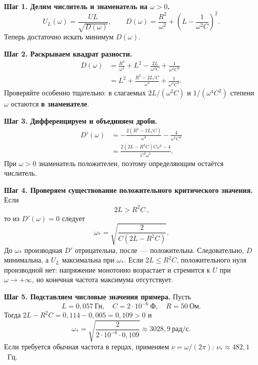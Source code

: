\documentclass[a4paper,12pt]{article}
\begin{document}
\textbf{Шаг 1. Делим числитель и знаменатель на $\omega>0$.}
\[
U_L(\omega)=\frac{UL}{\sqrt{D(\omega)}},\qquad
D(\omega)=\frac{R^2}{\omega^2}+
\left(L-\frac{1}{\omega^2 C}\right)^2.
\]
Теперь достаточно искать минимум $D(\omega)$.

\textbf{Шаг 2. Раскрываем квадрат разности.}
\[
\begin{aligned}
D(\omega)&=\frac{R^2}{\omega^2}
+L^2-\frac{2L}{\omega^2 C}+\frac{1}{\omega^4 C^2}\\
&=L^2+\frac{R^2-2L/C}{\omega^2}
+\frac{1}{\omega^4 C^2}.
\end{aligned}
\]
Проверяйте особенно тщательно: в слагаемых $2L/(\omega^2C)$ и $1/(\omega^4C^2)$ степени $\omega$ остаются \textbf{в знаменателе}.

\textbf{Шаг 3. Дифференцируем и объединяем дроби.}
\[
\begin{aligned}
D'(\omega)&=-\frac{2(R^2-2L/C)}{\omega^3}
-\frac{4}{\omega^5C^2}\\
&=\frac{2(2L-R^2C)C\omega^2-4}{C^2\omega^5}.
\end{aligned}
\]
При $\omega>0$ знаменатель положителен, поэтому определяющим остаётся числитель.

\textbf{Шаг 4. Проверяем существование положительного критического значения.}
Если
\[
\boxed{\ 2L>R^2C\ },
\]
то из $D'(\omega)=0$ следует
\[
\boxed{\omega_*=\sqrt{\frac{2}{C(2L-R^2C)}}}.
\]
До $\omega_*$ производная $D'$ отрицательна, после~--- положительна. Следовательно, $D$ минимальна, а $U_L$ максимальна при $\omega_*$. Если $2L\le R^2C$, положительного нуля производной нет: напряжение монотонно возрастает и стремится к $U$ при $\omega\to+\infty$, но конечная частота максимума отсутствует.

\textbf{Шаг 5. Подставляем числовые значения примера.} Пусть
\[
L=0{,}057\ \text{Гн},\quad C=2\cdot10^{-6}\ \text{Ф},\quad R=50\ \text{Ом}.
\]
Тогда $2L-R^2C=0{,}114-0{,}005=0{,}109>0$ и
\[
\omega_*=\sqrt{\frac{2}{2\cdot10^{-6}\cdot0{,}109}}
\approx\boxed{3028{,}9\ \text{рад/с}}.
\]
Если требуется обычная частота в герцах, применяем $\nu=\omega/(2\pi)$: $\nu_*\approx482{,}1$~Гц.
\end{document}
